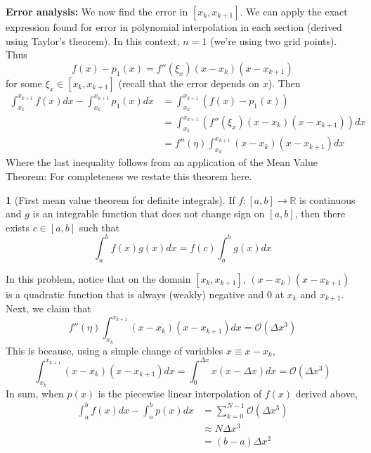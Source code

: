\documentclass[12pt]{article}
\theoremstyle{definition}
\newtheorem{theorem}{\color{ForestGreen}{\textbf{Theorem}}}
\newcommand{\R}{\mathbb{R}}
\theoremstyle{definition}
\begin{document}
\textbf{Error analysis:} We now find the error in $[x_k, x_{k+1}]$. We can apply the exact expression found for error in polynomial interpolation in each section (derived using Taylor's theorem). In this context, $n=1$ (we're using two grid points). Thus 
\begin{equation}
	f(x) - p_1(x) = f''(\xi_x)(x - x_k)(x - x_{k+1})
\end{equation}
for some $\xi_x \in [x_k, x_{k+1}]$ (recall that the error depends on $x$). Then
\begin{align*}
	\int_{x_k}^{x_{k+1}} f(x) dx - \int_{x_k}^{x_{k+1}} p_1(x)dx &= \int_{x_k}^{x_{k+1}} ( f(x) - p_1(x)) \\
	&= \int_{x_k}^{x_{k+1}} (f''(\xi_x)(x - x_k)(x - x_{k+1}))dx \\
	&= f''(\eta) \int_{x_k}^{x_{k+1}} (x - x_k)(x - x_{k+1}) dx
\end{align*}
Where the last inequality follows from an application of the Mean Value Theorem: For completeness we restate this theorem here.
\begin{theorem}[First mean value theorem for definite integrals]
	If $f:[a,b] \to \R$ is continuous and $g$ is an integrable function that does not change sign on $[a,b]$, then there exists $c \in [a,b]$ such that
	\begin{equation}
		\int_a^b f(x)g(x) dx = f(c)\int_a^b g(x)dx
	\end{equation}
\end{theorem}
In this problem, notice that on the domain $[x_k, x_{k+1}]$, $(x - x_k)(x - x_{k+1})$ is a quadratic function that is always (weakly) negative and $0$ at $x_k$ and $x_{k+1}$. Next, we claim that
\begin{equation}
	f''(\eta) \int_{x_k}^{x_{k+1}} (x - x_k)(x - x_{k+1}) dx = \mathcal{O}(\Delta x^3)
\end{equation}
This is because, using a simple change of variables $x \equiv x - x_k$,
\begin{equation}
	\int_{x_k}^{x_{k+1}} (x - x_k)(x - x_{k+1}) dx = \int_{0}^{\Delta x} x(x - \Delta x) dx = \mathcal{O}(\Delta x^3)
\end{equation}
In sum, when $p(x)$ is the piecewise linear interpolation of $f(x)$ derived above,
\begin{align*}
	\int_a^b f(x)dx - \int_a^b p(x) dx &= \sum_{k=0}^{N-1} \mathcal{O}(\Delta x^3) \\
	&\approx N \Delta x^3 \\
	&= (b-a) \Delta x^2 \tag{Recall $N\Delta x = b-a$}
\end{align*}
\end{document}
